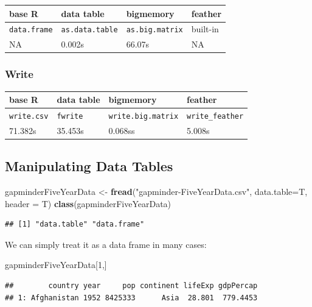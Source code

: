 \documentclass[]{article}
\newenvironment{Shaded}{\begin{snugshade}}{\end{snugshade}}
\newcommand{\KeywordTok}[1]{\textcolor[rgb]{0.13,0.29,0.53}{\textbf{{#1}}}}
\newcommand{\DataTypeTok}[1]{\textcolor[rgb]{0.13,0.29,0.53}{{#1}}}
\newcommand{\DecValTok}[1]{\textcolor[rgb]{0.00,0.00,0.81}{{#1}}}
\newcommand{\StringTok}[1]{\textcolor[rgb]{0.31,0.60,0.02}{{#1}}}
\newcommand{\NormalTok}[1]{{#1}}
\begin{document}
\begin{longtable}[c]{@{}llll@{}}
\toprule
\textbf{base R} & \textbf{data table} & \textbf{bigmemory} &
\textbf{feather}\tabularnewline
\midrule
\endhead
\texttt{data.frame} & \texttt{as.data.table} & \texttt{as.big.matrix} &
built-in\tabularnewline
NA & 0.002s & 66.07s & NA\tabularnewline
\bottomrule
\end{longtable}

\subsubsection{Write}\label{write}

\begin{longtable}[c]{@{}llll@{}}
\toprule
\textbf{base R} & \textbf{data table} & \textbf{bigmemory} &
\textbf{feather}\tabularnewline
\midrule
\endhead
\texttt{write.csv} & \texttt{fwrite} & \texttt{write.big.matrix} &
\texttt{write\_feather}\tabularnewline
71.382s & 35.453s & 0.068ss & 5.008s\tabularnewline
\bottomrule
\end{longtable}

\subsection{Manipulating Data Tables}\label{manipulating-data-tables}

\begin{Shaded}
\begin{Highlighting}[]
\NormalTok{gapminderFiveYearData <-}\StringTok{ }\KeywordTok{fread}\NormalTok{(}\StringTok{"gapminder-FiveYearData.csv"}\NormalTok{, }\DataTypeTok{data.table=}\NormalTok{T, }\DataTypeTok{header =} \NormalTok{T)}
\KeywordTok{class}\NormalTok{(gapminderFiveYearData)}
\end{Highlighting}
\end{Shaded}

\begin{verbatim}
## [1] "data.table" "data.frame"
\end{verbatim}

We can simply treat it as a data frame in many cases:

\begin{Shaded}
\begin{Highlighting}[]
\NormalTok{gapminderFiveYearData[}\DecValTok{1}\NormalTok{,]}
\end{Highlighting}
\end{Shaded}

\begin{verbatim}
##        country year     pop continent lifeExp gdpPercap
## 1: Afghanistan 1952 8425333      Asia  28.801  779.4453
\end{verbatim}
\end{document}
